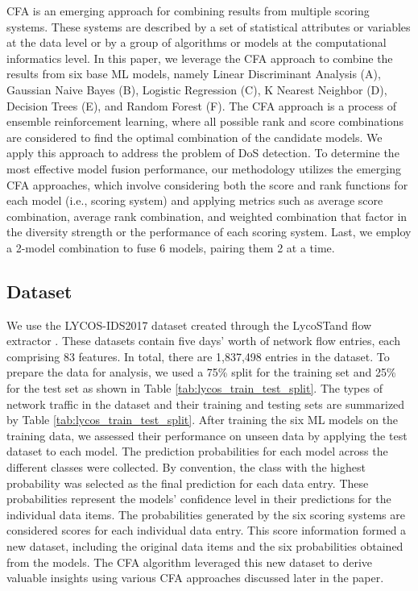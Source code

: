 CFA is an emerging approach for combining results from multiple scoring systems. These systems are described by a set of statistical attributes or variables at the data level or by a group of algorithms or models at the computational informatics level. In this paper, we leverage the CFA approach to combine the results from six base ML models, namely Linear Discriminant Analysis (A), Gaussian Naive Bayes (B), Logistic Regression (C), K Nearest Neighbor (D), Decision Trees (E), and Random Forest (F). The CFA approach is a process of ensemble reinforcement learning, where all possible rank and score combinations are considered to find the optimal combination of the candidate models. We apply this approach to address the problem of DoS detection. To determine the most effective model fusion performance, our methodology utilizes the emerging CFA approaches, which involve considering both the score and rank functions for each model (i.e., scoring system) and applying metrics such as average score combination, average rank combination, and weighted combination that factor in the diversity strength or the performance of each scoring system. Last, we employ a 2-model combination to fuse 6 models, pairing them 2 at a time.


\subsection{Dataset}

We use the LYCOS-IDS2017 dataset created through the LycoSTand flow extractor \cite{rosay2021cic}. These datasets contain five days' worth of network flow entries, each comprising 83 features. In total, there are 1,837,498 entries in the dataset. To prepare the data for analysis, we used a 75\% split for the training set and 25\% for the test set as shown in Table \ref{tab:lycos_train_test_split}. The types of network traffic in the dataset and their training and testing sets are summarized by Table \ref{tab:lycos_train_test_split}. After training the six ML models on the training data, we assessed their performance on unseen data by applying the test dataset to each model. The prediction probabilities for each model across the different classes were collected. By convention, the class with the highest probability was selected as the final prediction for each data entry. These probabilities represent the models' confidence level in their predictions for the individual data items. The probabilities generated by the six scoring systems are considered scores for each individual data entry. This score information formed a new dataset, including the original data items and the six probabilities obtained from the models. The CFA algorithm leveraged this new dataset to derive valuable insights using various CFA approaches discussed later in the paper.


